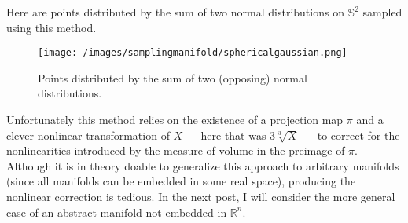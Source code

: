 Here are points distributed by the sum of two normal distributions on \(\mathbb{S}^2\) sampled using this method.
%
\begin{figure}
  \texttt{[image: /images/samplingmanifold/sphericalgaussian.png]}
  \caption{Points distributed by the sum of two (opposing) normal distributions.}
\end{figure}
%
Unfortunately this method relies on the existence of a projection map \(\pi\) and a clever nonlinear transformation of \(X\) --- here that was \(3 \sqrt[3]{X}\) --- to correct for the nonlinearities introduced by the measure of volume in the preimage of \(\pi.\)
Although it is in theory doable to generalize this approach to arbitrary manifolds (since all manifolds can be embedded in some real space), producing the nonlinear correction is tedious.
In the next post, I will consider the more general case of an abstract manifold not embedded in \(\mathbb{R}^n.\)
